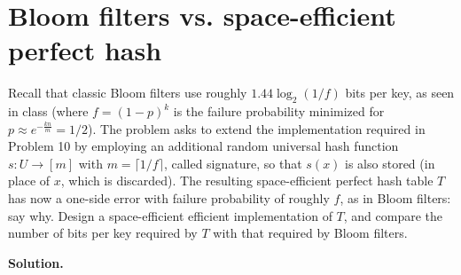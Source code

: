 \section{Bloom filters vs. space-efficient perfect hash}

Recall that classic Bloom filters use roughly $1.44\log_2(1/f)$ bits per key, as seen in class (where $f=(1-p)^k$ is the failure probability minimized for $p \approx e^{-\frac{kn}{m}} = 1/2$). The problem asks to extend the implementation required in Problem 10 by employing an additional random universal hash function $s : U \to [m]$ with $m = \lceil 1/f \rceil$, called signature, so that $s(x)$ is also stored (in place of $x$, which is discarded). The resulting space-efficient perfect hash table $T$ has now a one-side error with failure probability of roughly $f$, as in Bloom filters: say why. Design a space-efficient efficient implementation of $T$, and compare the number of bits per key required by $T$ with that required by Bloom filters.

\vspace{1cm}
\noindent
\textbf{Solution.} 